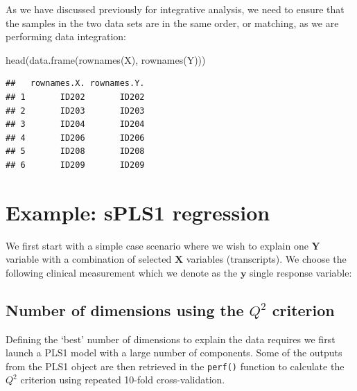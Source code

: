 \documentclass[
]{book}
\newenvironment{Shaded}{\begin{snugshade}}{\end{snugshade}}
\newcommand{\FunctionTok}[1]{\textcolor[rgb]{0.00,0.00,0.00}{#1}}
\newcommand{\NormalTok}[1]{#1}
\newcommand{\OtherTok}[1]{\textcolor[rgb]{0.56,0.35,0.01}{#1}}
\newcommand{\SpecialCharTok}[1]{\textcolor[rgb]{0.00,0.00,0.00}{#1}}
\newcommand{\StringTok}[1]{\textcolor[rgb]{0.31,0.60,0.02}{#1}}
\begin{document}
As we have discussed previously for integrative analysis, we need to ensure that the samples in the two data sets are in the same order, or matching, as we are performing data integration:

\begin{Shaded}
\begin{Highlighting}[]
\FunctionTok{head}\NormalTok{(}\FunctionTok{data.frame}\NormalTok{(}\FunctionTok{rownames}\NormalTok{(X), }\FunctionTok{rownames}\NormalTok{(Y)))}
\end{Highlighting}
\end{Shaded}

\begin{verbatim}
##   rownames.X. rownames.Y.
## 1       ID202       ID202
## 2       ID203       ID203
## 3       ID204       ID204
## 4       ID206       ID206
## 5       ID208       ID208
## 6       ID209       ID209
\end{verbatim}

\hypertarget{04:spls1}{%
\section{Example: sPLS1 regression}\label{04:spls1}}

We first start with a simple case scenario where we wish to explain one \(\boldsymbol Y\) variable with a combination of selected \(\boldsymbol X\) variables (transcripts). We choose the following clinical measurement which we denote as the \(\boldsymbol y\) single response variable:

\begin{Shaded}
\end{Shaded}

\hypertarget{04:spls1-ncomp}{%
\subsection{\texorpdfstring{Number of dimensions using the \(Q^2\) criterion}{Number of dimensions using the Q\^{}2 criterion}}\label{04:spls1-ncomp}}

Defining the `best' number of dimensions to explain the data requires we first launch a PLS1 model with a large number of components. Some of the outputs from the PLS1 object are then retrieved in the \texttt{perf()} function to calculate the \(Q^2\) criterion using repeated 10-fold cross-validation.
\end{document}
